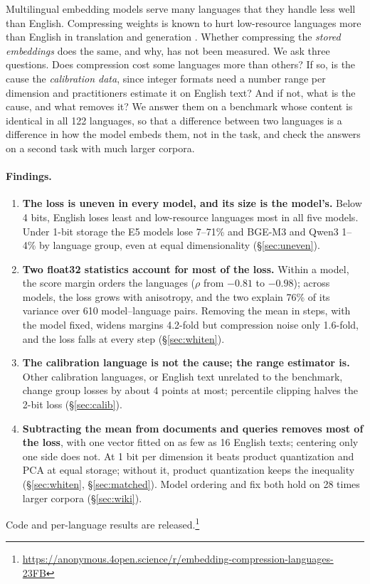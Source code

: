 \documentclass[11pt]{article}
\begin{document}
Multilingual embedding models serve many languages that they handle less well than English. Compressing weights is known to hurt low-resource languages more than English in translation and generation \citep{ahia2021doublebind,marchisio2024quantization,mekala2025longcontext}. Whether compressing the \emph{stored embeddings} does the same, and why, has not been measured. We ask three questions. Does compression cost some languages more than others? If so, is the cause the \emph{calibration data}, since integer formats need a number range per dimension and practitioners estimate it on English text? And if not, what is the cause, and what removes it? We answer them on a benchmark whose content is identical in all 122 languages, so that a difference between two languages is a difference in how the model embeds them, not in the task, and check the answers on a second task with much larger corpora.

\paragraph{Findings.}
\begin{enumerate}[nosep,leftmargin=*]
\item \textbf{The loss is uneven in every model, and its size is the model's.} Below 4 bits, English loses least and low-resource languages most in all five models. Under 1-bit storage the E5 models lose 7--71\% and BGE-M3 and Qwen3 1--4\% by language group, even at equal dimensionality (\S\ref{sec:uneven}).
\item \textbf{Two float32 statistics account for most of the loss.} Within a model, the score margin orders the languages ($\rho$ from $-0.81$ to $-0.98$); across models, the loss grows with anisotropy, and the two explain 76\% of its variance over 610 model--language pairs. Removing the mean in steps, with the model fixed, widens margins 4.2-fold but compression noise only 1.6-fold, and the loss falls at every step (\S\ref{sec:whiten}).
\item \textbf{The calibration language is not the cause; the range estimator is.} Other calibration languages, or English text unrelated to the benchmark, change group losses by about 4 points at most; percentile clipping halves the 2-bit loss (\S\ref{sec:calib}).
\item \textbf{Subtracting the mean from documents and queries removes most of the loss}, with one vector fitted on as few as 16 English texts; centering only one side does not. At 1 bit per dimension it beats product quantization and PCA at equal storage; without it, product quantization keeps the inequality (\S\ref{sec:whiten}, \S\ref{sec:matched}). Model ordering and fix both hold on 28 times larger corpora (\S\ref{sec:wiki}).
\end{enumerate}
Code and per-language results are released.\footnote{\url{https://anonymous.4open.science/r/embedding-compression-languages-23FB}}
\end{document}
